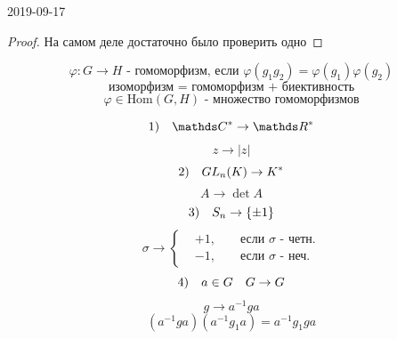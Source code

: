 \documentclass[main]{subfiles}
\begin{document}
\begin{lect} {2019-09-17}
\begin{proof}
		    На самом деле достаточно было проверить одно
		\end{proof}

		\begin{Definition}
				\[\varphi : G \to H \text{ - гомоморфизм, если } \varphi(g_1 g_2) = \varphi(g_1) \varphi(g_2)\]
				\[\text{изоморфизм = гомоморфизм + биективность}\]
				\[\varphi \in \text{Hom}(G, H) \text{ - множество гомоморфизмов}\]
		\end{Definition}

		\begin{Examples}
			\[1)\q \CC^* \to \R^*\]
			\[z \to |z|\]
			\[2)\quad GL_n(K) \to K^*\]
			\[A \to \det A\]
			\[3)\quad S_n \to  \{\pm 1\}\]
			\[\sigma \to \left\{ \begin{align}
					&+1,& &\text{ если } \sigma \text{ - четн.}\\
					&-1,& &\text{ если } \sigma \text{ - неч.}
			\end{align}\]
			\[4)\quad a \in G \quad G \to G\]
			\[g \to a^{-1}g a\]
			\[(a^{-1}g a)(a^{-1}g_1a) = a^{-1}g_1 g a \]
		\end{Examples}
	\end{lect}
\end{document}
